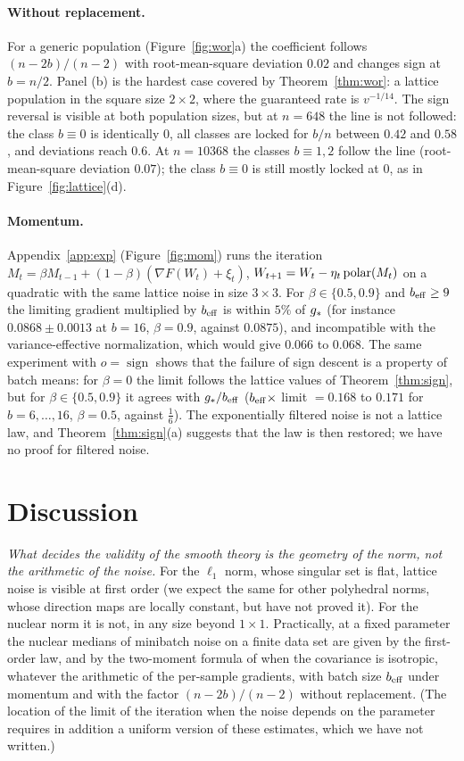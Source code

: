 \documentclass[anon,12pt]{colt2026}
\begin{document}
\paragraph{Without replacement.} For a generic population (Figure~\ref{fig:wor}a) the coefficient follows
$(n-2b)/(n-2)$ with root-mean-square deviation $0.02$ and changes sign at $b=n/2$. Panel (b) is the hardest case
covered by Theorem~\ref{thm:wor}: a lattice population in the square size $2\times2$, where the guaranteed rate is
$v^{-1/14}$. The sign reversal is visible at both population sizes, but at $n=648$ the line is not followed: the class
$b\equiv0$ is identically $0$, all classes are locked for $b/n$ between $0.42$ and $0.58$, and deviations reach $0.6$.
At $n=10368$ the classes $b\equiv1,2$ follow the line (root-mean-square deviation $0.07$); the class $b\equiv0$ is
still mostly locked at $0$, as in Figure~\ref{fig:lattice}(d).

\paragraph{Momentum.} Appendix~\ref{app:exp} (Figure~\ref{fig:mom}) runs the iteration
$M_t=\beta M_{t-1}+(1-\beta)(\nabla F(W_t)+\xi_t)$, $W_{t+1}=W_t-\eta_t\operatorname{polar}(M_t)$ on a quadratic with the same lattice
noise in size $3\times3$. For $\beta\in\{0.5,0.9\}$ and $b_{\mathrm{eff}}\ge9$ the limiting gradient multiplied by $b_{\mathrm{eff}}$ is within
$5\%$ of $g_\ast$ (for instance $0.0868\pm0.0013$ at $b=16$, $\beta=0.9$, against $0.0875$), and incompatible with the
variance-effective normalization, which would give $0.066$ to $0.068$. The same experiment with $o=\operatorname{sign}$ shows
that the failure of sign descent is a property of batch means: for $\beta=0$ the limit follows the lattice values of
Theorem~\ref{thm:sign}, but for $\beta\in\{0.5,0.9\}$ it agrees with $g_\ast/b_{\mathrm{eff}}$ ($b_{\mathrm{eff}}\times$ limit $=0.168$ to $0.171$
for $b=6,\dots,16$, $\beta=0.5$, against $\frac16$). The exponentially filtered noise is not a lattice law, and
Theorem~\ref{thm:sign}(a) suggests that the law is then restored; we have no proof for filtered noise.

\section{Discussion}\label{sec:disc}

\emph{What decides the validity of the smooth theory is the geometry of the norm, not the arithmetic of the noise.}
For the $\ell_1$ norm, whose singular set is flat, lattice noise is visible at first order (we expect the same for
other polyhedral norms, whose direction maps are locally constant, but have not proved it). For the nuclear norm it is not, in any size beyond
$1\times1$. Practically, at a fixed parameter the nuclear medians of minibatch noise on a finite data set are given by the
first-order law, and by the two-moment formula of \citet{companionI} when the covariance is isotropic, whatever the
arithmetic of the per-sample gradients, with batch size $b_{\mathrm{eff}}$ under momentum and with the factor $(n-2b)/(n-2)$
without replacement. (The location of the limit of the iteration when the noise depends on the parameter requires in
addition a uniform version of these estimates, which we have not written.)
\end{document}
